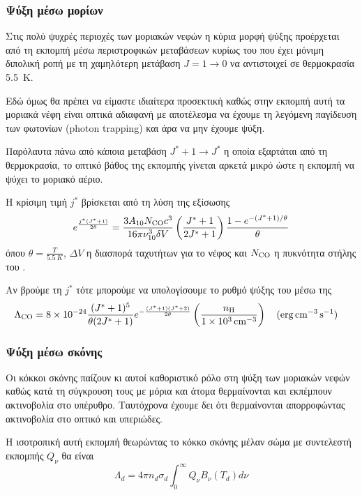 \subsubsection{Ψύξη μέσω μορίων}
Στις πολύ ψυχρές περιοχές των μοριακών νεφών η κύρια μορφή ψύξης προέρχεται από τη εκπομπή μέσω περιστροφικών μεταβάσεων κυρίως του  που έχει μόνιμη διπολική ροπή με τη χαμηλότερη μετάβαση $J=1\rightarrow 0$ να αντιστοιχεί σε θερμοκρασία \SI{5.5}{K}. 

Εδώ όμως θα πρέπει να είμαστε ιδιαίτερα προσεκτική καθώς στην εκπομπή αυτή τα μοριακά νέφη είναι οπτικά αδιαφανή με αποτέλεσμα να έχουμε τη λεγόμενη παγίδευση των φωτονίων (photon trapping) και άρα να μην έχουμε ψύξη. 

Παρόλαυτα πάνω από κάποια μεταβάση $J^*+1 \rightarrow J^*$ η οποία εξαρτάται από τη θερμοκρασία, το οπτικό βάθος της εκπομπής γίνεται αρκετά μικρό ώστε η εκπομπή να ψύχει το μοριακό αέριο.

Η κρίσιμη τιμή $j^*$ βρίσκεται από τη λύση της εξίσωσης
\begin{equation}
e^{\frac{j^* (J^*+1)}{2\theta}}=\frac{3 A_{10}N_{\ce{CO}}c^3}{16 \pi \nu _{10}^3 \delta V}
	\left(\frac{J^* +1}{2J^*+1} \right)\frac{1-e^{-(J^*+1)/\theta}}{\theta} 
\end{equation}
όπου $\theta=\frac{T}{\SI{5.5}{K}}$, $\Delta V$ η διασπορά ταχυτήτων για το νέφος και $N_{\ce{CO}}$ η πυκνότητα στήλης του .

Αν βρούμε τη $j^*$ τότε μπορούμε να υπολογίσουμε το ρυθμό ψύξης του  μέσω της
\begin{equation}
\Lambda _{\ce{CO}}=\num{8e-24} \frac{(J^*+1)^5}{\theta (2J^*+1)} e^{-\frac{(J^*+1)(J^*+2)}{2\theta}}
\left( \frac{n_{\ce{H}}}{\SI{1e3}{cm^{-3}}} \right)  \qq{(\si{erg.cm^{-3}.s^{-1}})} 
\end{equation}
\subsubsection{Ψύξη μέσω σκόνης}
Οι κόκκοι σκόνης παίζουν κι αυτοί καθοριστικό ρόλο στη ψύξη των μοριακών νεφών καθώς κατά τη σύγκρουση τους με μόρια και άτομα θερμαίνονται και εκπέμπουν ακτινοβολία στο υπέρυθρο. Ταυτόχρονα έχουμε δει ότι  θερμαίνονται απορροφώντας ακτινοβολία στο οπτικό και υπεριώδες. 

Η ισοτροπική αυτή εκπομπή θεωρώντας το κόκκο σκόνης μέλαν σώμα με συντελεστή εκπομπής $Q_\nu$ θα είναι
\begin{equation}
\Lambda _d = 4\pi n_d \sigma _d \int_{0}^{\infty} Q_\nu B_\nu (T_d)d\nu
\end{equation}

